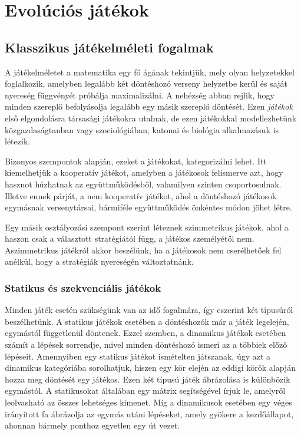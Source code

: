 \chapter{Evolúciós játékok}

\section{Klasszikus játékelméleti fogalmak}

A játékelméletet a matematika egy fő ágának tekintjük, mely olyan helyzetekkel foglalkozik, amelyben legalább két döntéshozó verseny helyzetbe kerül és saját nyereség függvényét próbálja maximalizálni. A nehézség abban rejlik, hogy minden szereplő befolyásolja legalább egy másik szereplő döntését. Ezen \textit{játékok} első elgondolásra társasági játékokra utalnak, de ezen játékokkal modellezhetünk közgazdaságtanban vagy szociológiában, katonai és biológia alkalmazásuk is létezik.

Bizonyos szempontok alapján, ezeket a játékokat, kategorizálni lehet. Itt kiemelhetjük a kooperatív játékot, amelyben a játékosok felismerve azt, hogy hasznot húzhatnak az együttműködésből, valamilyen szinten csoportosulnak. Illetve ennek párját, a nem kooperatív játékot, ahol a döntéshozó játékosok egymásnak versenytársai, bármiféle együttműködés önkéntes módon jöhet létre.

Egy másik osztályozási szempont szerint léteznek szimmetrikus játékok, ahol a haszon csak a választott stratégiától függ, a játékos személyétől nem. Aszimmetrikus játékról akkor beszélünk, ha a játékosok nem cserélhetőek fel anélkül, hogy a stratégiák nyereségén változtatnánk.

\subsection{Statikus és szekvenciális játékok}
Minden játék esetén szükségünk van az idő fogalmára, így eszerint két típusúról beszélhetünk. A statikus játékok esetében a döntéshozók már a játék legelején, egymástól függetlenül döntenek. Ezzel szemben, a dinamikus játékok esetében számít a lépések sorrendje, mivel minden döntéshozó ismeri az a többiek előző lépéseit. Amennyiben egy statikus játékot ismételten játszanak, úgy azt a dinamikus kategóriába sorolhatjuk, hiszen egy kör elején az eddigi körök alapján hozza meg döntését egy játékos. Ezen két típusú játék ábrázolása is különbözik egymástól. A statikusokat általában egy mátrix segítségével írjuk le, amelyről leolvasható az összes lehetséges kimenet. Míg a dinamikusok esetében egy véges irányított fa ábrázolja az egymás utáni lépéseket, amely gyökere a kezdőállapot, ahonnan bármely ponthoz egyetlen egy út vezet.

